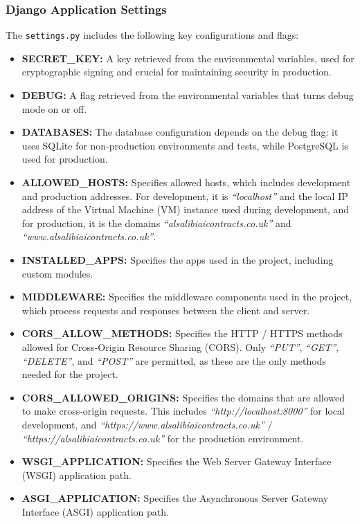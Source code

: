 \subsubsection{Django Application Settings}

The \texttt{settings.py} includes the following key configurations and flags:
\begin{itemize}
    \item \textbf{SECRET\_KEY:} A key retrieved from the environmental variables, used for cryptographic signing and crucial for maintaining security in production.
    \item \textbf{DEBUG:} A flag retrieved from the environmental variables that turns debug mode on or off.
    \item \textbf{DATABASES:} The database configuration depends on the debug flag: it uses SQLite for non-production environments and tests, while PostgreSQL is used for production.
    \item \textbf{ALLOWED\_HOSTS:} Specifies allowed hosts, which includes development and production addresses. For development, it is \textit{``localhost''} and the local IP address of the Virtual Machine (VM) instance used during development, and for production, it is the domains \textit{``alsalibiaicontracts.co.uk''} and \textit{``www.alsalibiaicontracts.co.uk''}.
    \item \textbf{INSTALLED\_APPS:}  Specifies the apps used in the project, including custom modules.
    \item \textbf{MIDDLEWARE:} Specifies the middleware components used in the project, which process requests and responses between the client and server.
    \item \textbf{CORS\_ALLOW\_METHODS:} Specifies the HTTP / HTTPS methods allowed for Cross-Origin Resource Sharing (CORS). Only \textit{``PUT''}, \textit{``GET''}, \textit{``DELETE''}, and \textit{``POST''} are permitted, as these are the only methods needed for the project.
    \item \textbf{CORS\_ALLOWED\_ORIGINS:} Specifies the domains that are allowed to make cross-origin requests. This includes \textit{``http://localhost:8000''} for local development, and \textit{``https://www.alsalibiaicontracts.co.uk''} / \textit{``https://alsalibiaicontracts.co.uk''} for the production environment.
    \item \textbf{WSGI\_APPLICATION:} Specifies the Web Server Gateway Interface (WSGI) application path.
    \item \textbf{ASGI\_APPLICATION:} Specifies the Asynchronous Server Gateway Interface (ASGI) application path.

\end{itemize}
